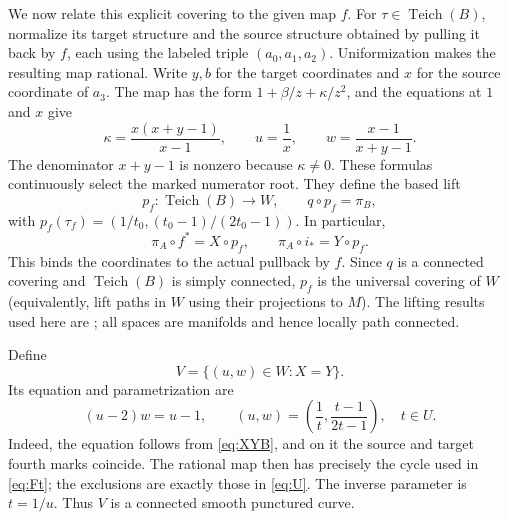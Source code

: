 \documentclass[11pt]{article}
\newcommand{\Teich}{\operatorname{Teich}}
\theoremstyle{remark}
\begin{document}

We now relate this explicit covering to the given map $f$. For $\tau\in\Teich(B)$, normalize its target structure and the source structure obtained by pulling it back by $f$, each using the labeled triple $(a_0,a_1,a_2)$. Uniformization makes the resulting map rational. Write $y,b$ for the target coordinates and $x$ for the source coordinate of $a_3$. The map has the form $1+\beta/z+\kappa/z^2$, and the equations at $1$ and $x$ give
\[
 \kappa=\frac{x(x+y-1)}{x-1},\qquad
 u=\frac1x,\qquad w=\frac{x-1}{x+y-1}.
\]
The denominator $x+y-1$ is nonzero because $\kappa\ne0$. These formulas continuously select the marked numerator root. They define the based lift
\begin{equation}\label{eq:pf}
 p_f:\Teich(B)\longrightarrow W,\qquad q\circ p_f=\pi_B,
\end{equation}
with $p_f(\tau_f)=(1/t_0,(t_0-1)/(2t_0-1))$. In particular,
\begin{equation}\label{eq:intended}
 \pi_A\circ f^*=X\circ p_f,\qquad
 \pi_A\circ i_*=Y\circ p_f.
\end{equation}
This binds the coordinates to the actual pullback by $f$. Since $q$ is a connected covering and $\Teich(B)$ is simply connected, $p_f$ is the universal covering of $W$ (equivalently, lift paths in $W$ using their projections to $M$). The lifting results used here are \cite[Section 1.3, Propositions 1.31--1.34]{Hatcher}; all spaces are manifolds and hence locally path connected.

Define
\[
 V=\{(u,w)\in W:X=Y\}.
\]
Its equation and parametrization are
\begin{equation}\label{eq:V}
 (u-2)w=u-1,\qquad
 (u,w)=\left(\frac1t,\frac{t-1}{2t-1}\right),\quad t\in U.
\end{equation}
Indeed, the equation follows from \eqref{eq:XYB}, and on it the source and target fourth marks coincide. The rational map then has precisely the cycle used in \eqref{eq:Ft}; the exclusions are exactly those in \eqref{eq:U}. The inverse parameter is $t=1/u$. Thus $V$ is a connected smooth punctured curve.
\end{document}
